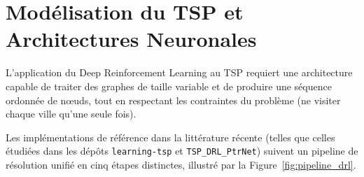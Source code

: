 \documentclass[12pt, a4paper, twoside, openright]{book}
\begin{document}
	\section{Modélisation du TSP et Architectures Neuronales}
	\label{sec:modelisation_tsp}
	
	L'application du Deep Reinforcement Learning au TSP requiert une architecture capable de traiter des graphes de taille variable et de produire une séquence ordonnée de n\oe{}uds, tout en respectant les contraintes du problème (ne visiter chaque ville qu'une seule fois).
	
	Les implémentations de référence dans la littérature récente (telles que celles étudiées dans les dépôts \texttt{learning-tsp} et \texttt{TSP\_DRL\_PtrNet}) suivent un pipeline de résolution unifié en cinq étapes distinctes, illustré par la Figure~\ref{fig:pipeline_drl}.
	
\end{document}
